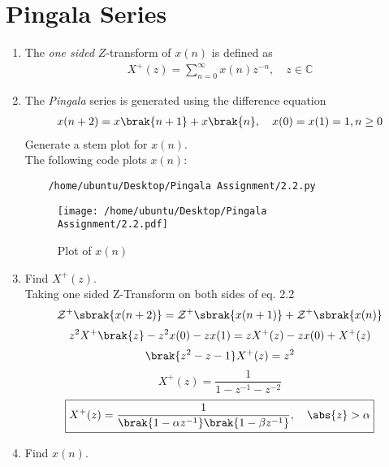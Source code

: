 \documentclass[journal,12pt,twocolumn]{IEEEtran}
\renewcommand\thesection{\arabic{section}}
\begin{document}
\section{Pingala Series}
\begin{enumerate}[label=\thesection.\arabic*,ref=\thesection.\theenumi]
\item The {\em one sided} $Z$-transform of $x(n)$ is defined as 
\begin{align}
	X^{+}(z) = \sum_{n = 0}^{\infty}x(n)z^{-n}, \quad z \in \mathbb{C}
\label{eq:one-Z}
\end{align}
	\item The {\em Pingala} series is generated using the difference equation 
\begin{align}
	x(n+2) = x\brak{n+1} + x\brak{n},  \quad x(0) = x(1) = 1, n \ge 0
	\label{eq:10-pingala}
\end{align}
Generate a stem plot for $x(n)$. \\
\solution
The following code plots $x(n)$:
\begin{lstlisting}
	/home/ubuntu/Desktop/Pingala Assignment/2.2.py
\end{lstlisting}
\begin{figure}[!htp]
	\texttt{[image: /home/ubuntu/Desktop/Pingala Assignment/2.2.pdf]}
	\caption{Plot of $x(n)$}
	\label{fig:xn}
\end{figure}
\item 		Find $X^{+}(z)$. \\
\solution
Taking one sided Z-Transform on both sides of eq. 2.2
\begin{equation}
	\mathcal{Z}^{+}\sbrak{x(n + 2)} = \mathcal{Z}^{+}\sbrak{x(n + 1)} + \mathcal{Z}^{+}\sbrak{x(n)}
\end{equation}
\begin{equation}
	{z}^{2}X^{+}\brak{z} - z^{2}x(0) - zx(1) = zX^{+}(z) - zx(0) + X^{+}(z)
\end{equation}
\begin{equation}
	\brak{z^{2} - z - 1}X^{+}(z) = z^{2}
\end{equation}
\begin{equation}
	X^{+}(z) = \frac{1}{1 - z^{-1} - z^{-2}}
\end{equation}
\begin{equation}
	\boxed{X^{+}(z) = \frac{1}{\brak{1 - \alpha{z^{-1}}}\brak{1 - \beta{z^{-1}}}} ,\quad \abs{z} > \alpha}
\end{equation}
\item Find $x(n)$. \\

\end{enumerate}
\end{document}
